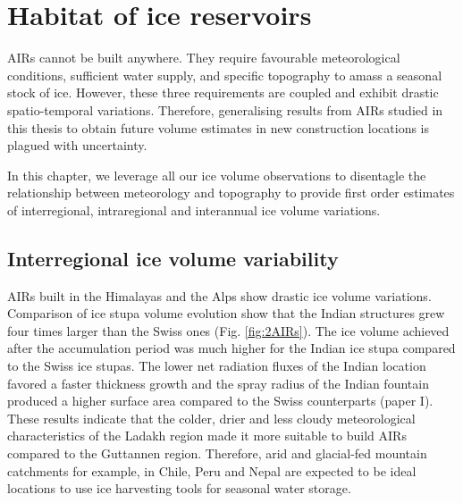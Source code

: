 \chapter{Habitat of ice reservoirs}


\ac{AIRs} cannot be built anywhere. They require favourable meteorological conditions, sufficient water supply,
and specific topography to amass a seasonal stock of ice. However, these three requirements are coupled and
exhibit drastic spatio-temporal variations. Therefore, generalising results from AIRs studied in this thesis to
obtain future volume estimates in new construction locations is plagued with uncertainty.

In this chapter, we leverage all our ice volume observations to disentagle the relationship between meteorology
and topography to provide first order estimates of interregional, intraregional and interannual ice volume
variations. 


%

\section{Interregional ice volume variability}

\ac{AIRs} built in the Himalayas and the Alps show drastic ice volume variations. Comparison of ice stupa volume
evolution show that the Indian structures grew four times larger than the Swiss ones (Fig. \ref{fig:2AIRs}). The
ice volume achieved after the accumulation period was much higher for the Indian ice stupa compared to the Swiss
ice stupas. The lower net radiation fluxes of the Indian location favored a faster thickness growth and the
spray radius of the Indian fountain produced a higher surface area compared to the Swiss counterparts (paper I).
These results indicate that the colder, drier and less cloudy meteorological characteristics of the Ladakh
region made it more suitable to build \ac{AIRs} compared to the Guttannen region. Therefore, arid and
glacial-fed mountain catchments for example, in Chile, Peru and Nepal are expected to be ideal locations to use
ice harvesting tools for seasonal water storage.

